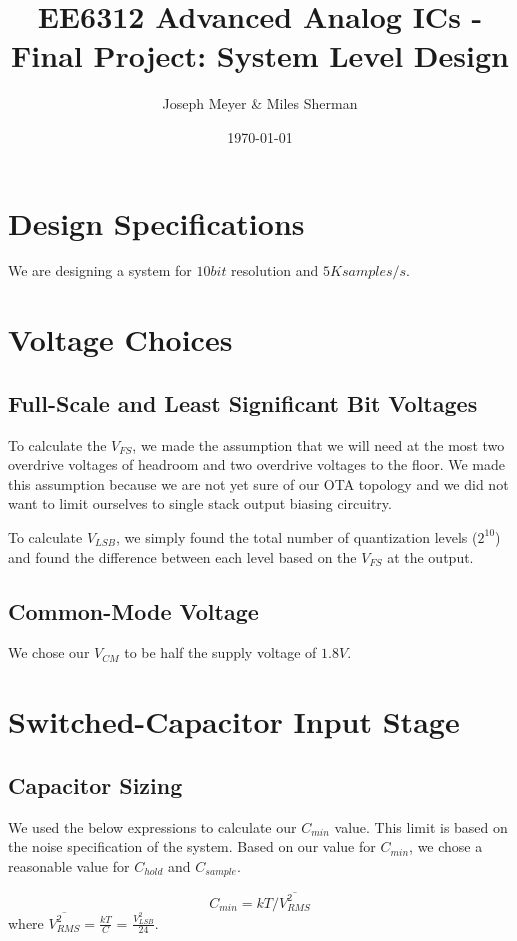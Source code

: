 \documentclass{article}
\begin{document}
\title{EE6312 Advanced Analog ICs - Final Project: System Level Design}
\author{Joseph Meyer \& Miles Sherman}
\date{\today}
\maketitle

\section{Design Specifications}
We are designing a system for $10 bit$ resolution and $5K samples/s$.

\section{Voltage Choices}
\subsection{Full-Scale and Least Significant Bit Voltages}
To calculate the $V_{FS}$, we made the assumption that we will need at the most two overdrive voltages of headroom and two overdrive voltages to the floor. We made this assumption because we are not yet sure of our OTA topology and we did not want to limit ourselves to single stack output biasing circuitry. 

To calculate $V_{LSB}$, we simply found the total number of quantization levels ($2^{10}$) and found the difference between each level based on the $V_{FS}$ at the output.

\subsection{Common-Mode Voltage}
We chose our $V_{CM}$ to be half the supply voltage of $1.8V$.

\section{Switched-Capacitor Input Stage}
\subsection{Capacitor Sizing}
We used the below expressions to calculate our $C_{min}$ value. This limit is based on the noise specification of the system. Based on our value for $C_{min}$, we chose a reasonable value for $C_{hold}$ and $C_{sample}$.

\begin{equation}
C_{min} = kT/\overline{V_{RMS}^{2}}
\end{equation}
where $\overline{V_{RMS}^{2}} = \frac{kT}{C}$ = $\frac{V_{LSB}^{2}}{24}$.
\end{document}
